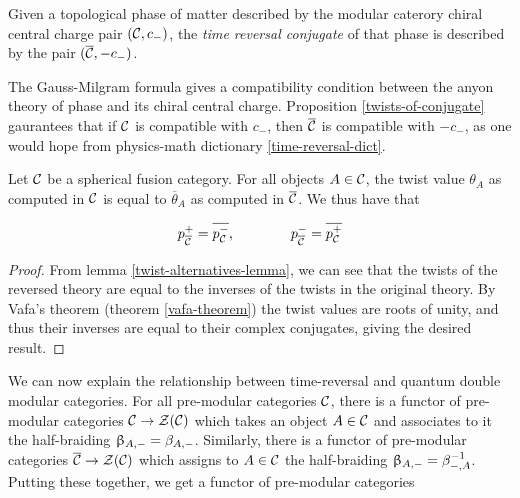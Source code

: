 \begin{dict}\label{time-reversal-dict} Given a topological phase of matter described by the modular caterory chiral central charge pair $({\mathcal C},c_{-})$, the {\em time reversal conjugate} of that phase is described by the pair $(\overline{{\mathcal C}},-c_{-})$.
\end{dict}

\begin{rem} The Gauss-Milgram formula gives a compatibility condition between the anyon theory of phase and its chiral central charge. Proposition \ref{twists-of-conjugate} gaurantees that if ${\mathcal C}$ is compatible with $c_-$, then $\overline{{\mathcal C}}$ is compatible with $-c_{-}$, as one would hope from physics-math dictionary \ref{time-reversal-dict}.
\end{rem}

\begin{prop}\label{twists-of-conjugate} Let ${\mathcal C}$ be a spherical fusion category. For all objects $A\in {\mathcal C}$, the twist value $\theta_{A}$ as computed in ${\mathcal C}$ is equal to $\overline{\theta}_A$ as computed in $\overline{{\mathcal C}}$. We thus have that

$$p_{\overline{{\mathcal C}}}^{+}=\overline{p_{{\mathcal C}}^{-}}, \qquad\qquad p_{\overline{{\mathcal C}}}^{-}=\overline{p_{{\mathcal C}}^+}$$ 
\end{prop}
\begin{proof} From lemma \ref{twist-alternatives-lemma}, we can see that the twists of the reversed theory are equal to the inverses of the twists in the original theory. By Vafa's theorem (theorem \ref{vafa-theorem}) the twist values are roots of unity, and thus their inverses are equal to their complex conjugates, giving the desired result.
\end{proof}

We can now explain the relationship between time-reversal and quantum double modular categories. For all pre-modular categories ${\mathcal C}$, there is a functor of pre-modular categories ${\mathcal C}\to {\mathcal Z}({\mathcal C})$ which takes an object $A\in {\mathcal C}$ and associates to it the half-braiding $\upbeta_{A,-}=\beta_{A,-}$. Similarly, there is a functor of pre-modular categories $\overline{{\mathcal C}}\to{\mathcal Z}({\mathcal C})$ which assigns to $A\in {\mathcal C}$ the half-braiding $\upbeta_{A,-}=\beta_{-,A}^{-1}$. Putting these together, we get a functor of pre-modular categories

